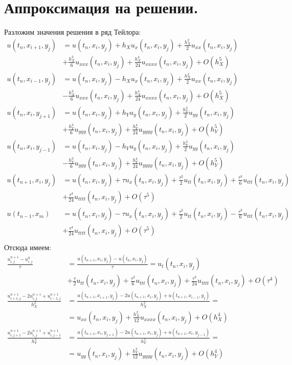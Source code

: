 \documentclass[14pt,a4paper]{extarticle}
\newcommand{\1}{\mathbbm{1}}
\begin{document}
\section{Аппроксимация на решении.}
Разложим значения решения в ряд Тейлора:
\begin{align*}
    u(t_n, x_{i+1}, y_j) &= u(t_n, x_{i}, y_j) +    h_X u_x(t_n, x_{i}, y_j) 
    + \frac{h_X^2}{2}u_{xx}(t_n, x_{i}, y_j) \\ &+\frac{h_X^3}{6}u_{xxx}(t_n, x_{i}, y_j) +    \frac{h_X^4}{24}u_{xxxx}(t_n, x_{i}, y_j) + O(h_X^5) \\
    u(t_n, x_{i-1}, y_{j}) &= u(t_n, x_{i}, y_j) - h_X u_x(t_n, x_{i}, y_j) 
    + \frac{h_X^2}{2}u_{xx}(t_n, x_{i}, y_j) \\ &-   \frac{h_X^3}{6}u_{xxx}(t_n, x_{i}, y_j) +    \frac{h_X^4}{24}u_{xxxx}(t_n, x_{i}, y_j) + O(h_X^5) \\
    u(t_n, x_{i}, y_{j+1}) &= u(t_n, x_{i}, y_j) +    h_Y u_y(t_n, x_{i}, y_j) 
    + \frac{h_Y^2}{2}u_{yy}(t_n, x_{i}, y_j) \\ &+ \frac{h_Y^3}{6}u_{yyy}(t_n, x_{i}, y_j) +    \frac{h_Y^4}{24}u_{yyyy}(t_n, x_{i}, y_j) + O(h_Y^5) \\
    u(t_n, x_{i}, y_{j-1}) &= u(t_n, x_{i}, y_j) - h_Y u_y(t_n, x_{i}, y_j) 
    + \frac{h_Y^2}{2}u_{yy}(t_n, x_{i}, y_j) \\ &- \frac{h_Y^3}{6}u_{yyy}(t_n, x_{i}, y_j) +    \frac{h_Y^4}{24}u_{yyyy}(t_n, x_{i}, y_j) + O(h_Y^5) \\
    u(t_{n+1}, x_i, y_j) &= u(t_{n}, x_i, y_j)+ \tau u_x(t_{n}, x_i, y_j) + \frac{\tau^2}{2}u_{tt}(t_n, x_i, y_j) + \frac{\tau^3}{6}u_{ttt}(t_n, x_i, y_j) \\
    &+ \frac{\tau^4}{24}u_{tttt}(t_n, x_i, y_j) + O(\tau^5) \\
    u(t_{n-1}, x_m) &= u(t_{n}, x_i, y_j)- \tau u_x(t_{n}, x_i, y_j) + \frac{\tau^2}{2}u_{tt}(t_n, x_i, y_j) - \frac{\tau^3}{6}u_{ttt}(t_n, x_i, y_j) \\
    &+ \frac{\tau^4}{24}u_{tttt}(t_n, x_i, y_j) + O(\tau^5) \\
\end{align*}
Отсюда имеем:
\begin{align*}
    \frac{u_{i, j}^{n+1} - u_{i, j}^n}{\tau} &=   \frac{u(t_{n+1}, x_i, y_j) - u(t_n, x_i, y_j)}{\tau} = u_t(t_{n}, x_i, y_j) \\
    &+\frac{\tau}{2}u_{tt}(t_n, x_{i}, y_j) + \frac{\tau^2}{6}u_{ttt}(t_n, x_{i}, y_j)+ \frac{\tau^3}{24}u_{tttt}(t_n, x_{i}, y_j) + O(\tau^4) \\
    \frac{u_{i+1, j}^{n+1} - 2 u_{i, j}^{n+1} + u_{i-1, j}^{n+1}}{h_X^2} &= \frac{u(t_{n+1}, x_{i+1}, y_j) - 2 u(t_{n+1}, x_{i}, y_j) + u(t_{n+1}, x_{i-1}, y_j)}{h_X^2} = \\
    &= u_{xx}(t_n, x_{i}, y_j) + \frac{h_X^2}{12}u_{xxxx}(t_n, x_{i}, y_j) + O(h_X^4)\\
    \frac{u_{i, j+1}^{n+1} - 2 u_{i, j}^{n+1} + u_{i, j-1}^{n+1}}{h_Y^2} &=\frac{u(t_{n+1}, x_{i}, y_{j+1}) - 2 u(t_{n+1}, x_{i}, y_j) + u(t_{n+1}, x_{i}, y_{j-1})}{h_Y^2} = \\
    &= u_{yy}(t_n, x_{i}, y_j) + \frac{h_Y^2}{12}u_{yyyy}(t_n, x_{i}, y_j) + O(h_Y^4)
\end{align*}
\end{document}
